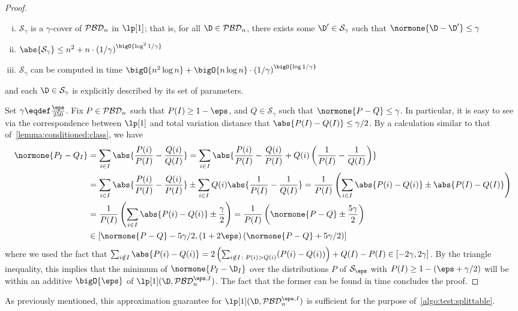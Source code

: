 \begin{proof}
\begin{theorem}[{\cite[Theorem 1]{DP:13}}]
\begin{enumerate}[(i)]
  \item $\mathcal{S}_{\gamma}$ is a $\gamma$-cover of $\mathcal{PBD}_n$ in $\lp[1]$; that is, for all $\D \in \classpbd_n$, there exists some $\D^\prime \in \mathcal{S}_{\gamma}$ such that $\normone{\D-\D^\prime} \leq \gamma$
  \item {$\abs{\mathcal{S}_{\gamma}} \le n^2 + n \cdot \left({1/\gamma}\right)^{\bigO{ \log^2{1/\gamma}}}$}
  \item $\mathcal{S}_{\gamma}$ can be computed in time {$\bigO{ n^2 \log n} + \bigO{n \log n} \cdot \left( {1/\gamma} \right)^{\bigO{\log{1/\gamma}}}$}
  \end{enumerate}
and each $\D\in\mathcal{S}_{\gamma}$  is explicitly described by its set of parameters.
\end{theorem}
\fi

Set $\gamma\eqdef\frac{\eps}{250}$. Fix $P\in\mathcal{PBD}_n$ such that $P(I) \geq 1-\eps$, and $Q\in \mathcal{S}_{\gamma}$ such that $\normone{P-Q}\leq \gamma$. In particular, it is easy to see via the correspondence between $\lp[1]$ and total variation distance that $\abs{P(I)-Q(I)} \leq \gamma/2$.
By a calculation similar to that of~\cref{lemma:conditioned:class}, we have 
\begin{align*}
  \normone{P_I-Q_I} &= \sum_{i\in I}\abs{\frac{P(i)}{P(I)} - \frac{Q(i)}{Q(I)}} 
  = \sum_{i\in I}\abs{\frac{P(i)}{P(I)} - \frac{Q(i)}{P(I)} + Q(i)\left( \frac{1}{P(I)} - \frac{1}{Q(I)} \right) } \\
  &= \sum_{i\in I}\abs{\frac{P(i)}{P(I)} - \frac{Q(i)}{P(I)} } \pm \sum_{i\in I} Q(i)\abs{ \frac{1}{P(I)} - \frac{1}{Q(I)} }
  = \frac{1}{P(I)}\left( \sum_{i\in I}\abs{ P(i) - Q(i) } \pm \abs{P(I)-Q(I)}\right) \\
  &= \frac{1}{P(I)}\left( \sum_{i\in I}\abs{ P(i) - Q(i) } \pm \frac{\gamma}{2}\right) = \frac{1}{P(I)}\left( \normone{ P - Q } \pm \frac{5\gamma}{2}\right) \\
  &\in [ \normone{ P - Q } - {5\gamma}/{2}, (1+2\eps)\left( \normone{ P - Q } + {5\gamma}/{2} \right) ]
  \end{align*}
where we used the fact that $\sum_{i\notin I}\abs{ P(i) - Q(i) } = 2\left(\sum_{i\notin I\colon P(i) > Q(i)} (P(i)-Q(i))\right) + Q(I)-P(I) \in [-2\gamma,2\gamma]$.
By the triangle inequality, this implies that the minimum of $\normone{P_I-\D_I}$ over the distributions $P$ of $\mathcal{S}_\eps$ with $P(I)\geq 1-(\eps+\gamma/2)$ will be within an additive $\bigO{\eps}$ of $\lp[1](\D,\classpbd_n^{\eps,I})$. The fact that the former can be found  in time  concludes the proof.
\end{proof}
As previously mentioned, this approximation guarantee for $\lp[1](\D,\classpbd_n^{\eps,I})$ is sufficient for the purpose of~\cref{algo:test:splittable}.

